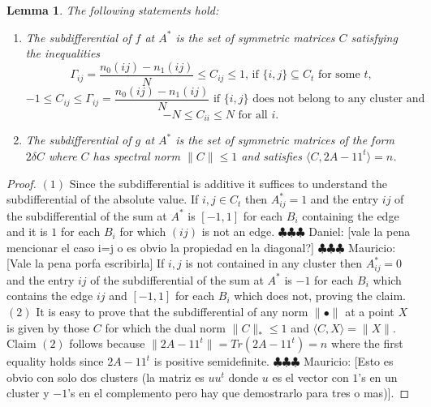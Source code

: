 \documentclass[12pt]{amsart}
\newtheorem{lemma}{Lemma}[section]
\theoremstyle{remark}
\DeclareMathOperator*{\argmin}{arg\,min}
\newcommand{\PP}{\mathbb{P}}
\newcommand{\ddr}[1]{{\color{blue} \sf $\clubsuit\clubsuit\clubsuit$ Daniel: [#1]}}
\newcommand{\mv}[1]{{\color{red} \sf $\clubsuit\clubsuit\clubsuit$ Mauricio: [#1]}}
\begin{document}
\begin{lemma} The following statements hold:
\label{lem: subdiff}
\begin{enumerate}
\item The subdifferential of $f$ at $A^*$ is the set of symmetric matrices $C$ satisfying the inequalities
\[ \Gamma_{ij}=\frac{n_0(ij)-n_1(ij)}{N}\leq C_{ij}\leq 1 \text{, if $\{i,j\}\subseteq C_t$ for some $t$,}\]
\[-1\leq C_{ij} \leq \Gamma_{ij}=\frac{n_0(ij)-n_1(ij)}{N} \text{ if $\{i,j\}$ does not belong to any cluster and } \]
\[-N \leq C_{ii} \leq N \text{ for all }i.\]

\item The subdifferential of $g$ at $A^*$ is the set of symmetric matrices of the form $2\delta C$ where $C$ has spectral norm $\|C\|\leq 1$ and satisfies $\langle C, 2A-11^t\rangle = n$.

\end{enumerate}

\end{lemma}
\begin{proof} $(1)$ Since the subdifferential is additive it suffices to understand the subdifferential of the absolute value. If $i,j\in C_t$ then $A^*_{ij}=1$ and the entry $ij$ of the subdifferential of the sum at $A^*$ is $[-1,1]$ for each $B_i$ containing the edge and it is $1$ for each $B_i$ for which $(ij)$ is not an edge. \ddr{vale la pena mencionar el caso i=j o es obvio la propiedad en la diagonal?}\mv{Vale la pena porfa escribirla} If $i,j$ is not contained in any cluster then $A^*_{ij}=0$ and the entry $ij$ of the subdifferential of the sum at $A^*$ is $-1$ for each $B_i$ which contains the edge $ij$ and $[-1,1]$ for each $B_i$ which does not, proving the claim. $(2)$ It is easy to prove that the subdifferential of any norm $\|\bullet\|$ at a point $X$ is given by those $C$ for which the dual norm $\|C\|_*\leq 1$ and $\langle C,X\rangle =\|X\|$. Claim $(2)$ follows because $\|2A-11^t\|=Tr(2A-11^t)=n$ where the first equality holds since $2A-11^t$ is positive semidefinite.\mv{Esto es obvio con solo dos clusters (la matriz es $uu^t$ donde $u$ es el vector con $1$'s en un cluster y $-1$'s en el complemento pero hay que demostrarlo para tres o mas)}.
\end{proof}


\end{document}
